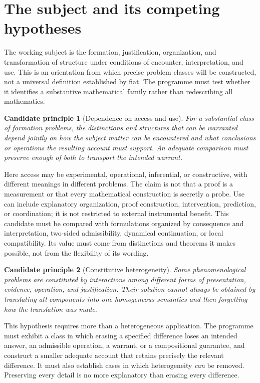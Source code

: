 \documentclass[11pt]{article}
\newtheorem{principle}{Candidate principle}[section]
\theoremstyle{definition}
\begin{document}
\section{The subject and its competing hypotheses}
\label{sec:subject}

The working subject is the formation, justification, organization, and transformation of structure under conditions of encounter, interpretation, and use. This is an orientation from which precise problem classes will be constructed, not a universal definition established by fiat. The programme must test whether it identifies a substantive mathematical family rather than redescribing all mathematics.

\begin{principle}[Dependence on access and use]
For a substantial class of formation problems, the distinctions and structures that can be warranted depend jointly on how the subject matter can be encountered and what conclusions or operations the resulting account must support. An adequate comparison must preserve enough of both to transport the intended warrant.
\end{principle}

Here access may be experimental, operational, inferential, or constructive, with different meanings in different problems. The claim is not that a proof is a measurement or that every mathematical construction is secretly a probe. Use can include explanatory organization, proof construction, intervention, prediction, or coordination; it is not restricted to external instrumental benefit. This candidate must be compared with formulations organized by consequence and interpretation, two-sided admissibility, dynamical continuation, or local compatibility. Its value must come from distinctions and theorems it makes possible, not from the flexibility of its wording.

\begin{principle}[Constitutive heterogeneity]
Some phenomenological problems are constituted by interactions among different forms of presentation, evidence, operation, and justification. Their solution cannot always be obtained by translating all components into one homogeneous semantics and then forgetting how the translation was made.
\end{principle}

This hypothesis requires more than a heterogeneous application. The programme must exhibit a class in which erasing a specified difference loses an intended answer, an admissible operation, a warrant, or a compositional guarantee, and construct a smaller adequate account that retains precisely the relevant difference. It must also establish cases in which heterogeneity \emph{can} be removed. Preserving every detail is no more explanatory than erasing every difference.
\end{document}
